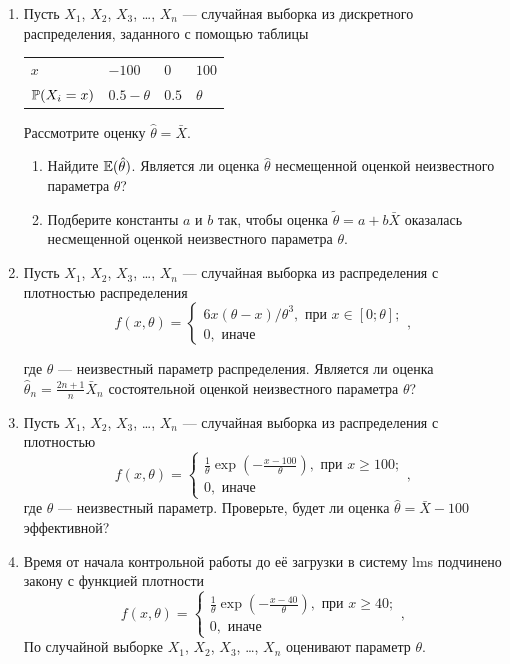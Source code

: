 \begin{enumerate}

  \item  Пусть $X_1$, $X_2$, $X_3$, \ldots, $X_n$ — случайная выборка из дискретного распределения, 
  заданного с помощью таблицы
  
  \begin{tabular}{@{}llll@{}}
    \toprule
     $x$           & $-100$ & $0$ & $100$ \\ 
     $\P(X_i = x)$ & $0.5-\theta$ & $0.5$ & $\theta$ \\
    \bottomrule
  \end{tabular}
        
  Рассмотрите оценку $\hat \theta = \bar X$.
  \begin{enumerate}
  \item Найдите $\E(\hat \theta)$. 
  Является ли оценка $\hat \theta$ несмещенной оценкой неизвестного параметра $\theta$?
  \item Подберите константы $a$ и $b$ так, 
  чтобы оценка $\tilde \theta = a + b\bar X$ оказалась несмещенной оценкой неизвестного параметра $\theta$.
  \end{enumerate} 
  
  
  \item Пусть $X_1$, $X_2$, $X_3$, \ldots, $X_n$ — 
  случайная выборка из распределения с плотностью распределения
  \[
  f(x, \theta) = \begin{cases}
    6x(\theta - x)/\theta^3, \text{ при } x\in [0;\theta]; \\
    0, \text{ иначе}
  \end{cases},
  \]
  
  где $\theta$ — неизвестный параметр распределения. 
  Является ли оценка $\hat\theta_n = \frac{2n+1}{n}\bar X_n$ состоятельной оценкой неизвестного параметра $\theta$?
  
  \item Пусть $X_1$, $X_2$, $X_3$, \ldots, $X_n$ — случайная выборка из распределения с плотностью
  \[
    f(x, \theta) = \begin{cases}
      \frac{1}{\theta}\exp\left(-\frac{x-100}{\theta}\right), \text{ при } x\geq 100; \\
      0, \text{ иначе}
    \end{cases},    
  \]
  где $\theta$ — неизвестный параметр. Проверьте, будет ли оценка $\hat\theta = \bar X - 100$ эффективной?
  
  \item  Время от начала контрольной работы до её загрузки в систему lms  подчинено закону с функцией плотности
  \[
    f(x, \theta) = \begin{cases}
      \frac{1}{\theta}\exp\left(-\frac{x-40}{\theta}\right), \text{ при } x\geq 40; \\
      0, \text{ иначе}
    \end{cases},    
  \]
  По случайной выборке $X_1$, $X_2$, $X_3$, \ldots, $X_n$ оценивают параметр $\theta$. 
  

\end{enumerate}
